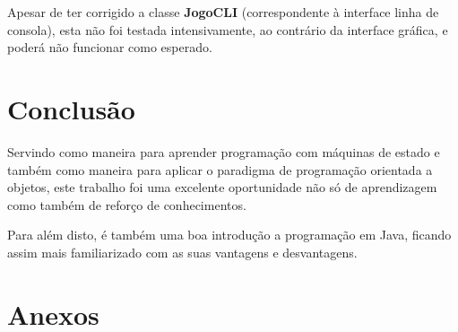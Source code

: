 \documentclass[11pt]{article}
\begin{document}
	Apesar de ter corrigido a classe \textbf{JogoCLI} (correspondente à interface linha de consola), esta não foi testada intensivamente, ao contrário da interface gráfica, e poderá não funcionar como esperado.
	

	\large
	\section{Conclusão}
	\normalsize
	
	Servindo como maneira para aprender programação com máquinas de estado e também como maneira para aplicar o paradigma de programação orientada a objetos, este trabalho foi uma excelente oportunidade não só de aprendizagem como também de reforço de conhecimentos.
	
	Para além disto, é também uma boa introdução a programação em Java, ficando assim mais familiarizado com as suas vantagens e desvantagens.
	
	
	\pagebreak
	
	\large
	\section{Anexos}
	\normalsize
	
	\listoffigures
\end{document}
